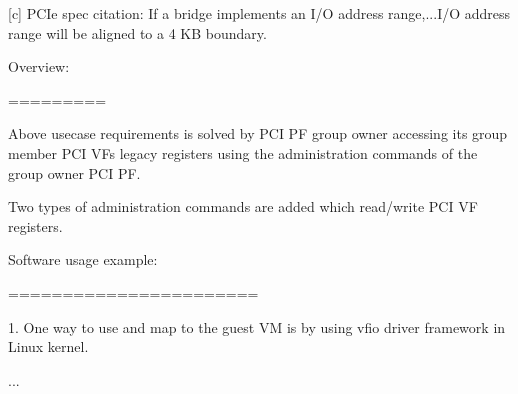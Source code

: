 {[c] PCIe spec citation:
If a bridge implements an I/O address range,...I/O address range will be
aligned to a 4 KB boundary.

\vspace{\baselineskip}
Overview:

=========

Above usecase requirements is solved by PCI PF group owner accessing
its group member PCI VFs legacy registers using the administration
commands of the group owner PCI PF.

Two types of administration commands are added which read/write PCI VF
registers.

Software usage example:

=======================
\vspace{\baselineskip}

1. One way to use and map to the guest VM is by using vfio driver
framework in Linux kernel.

...
}\\
\hline
